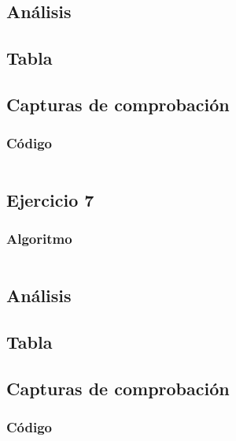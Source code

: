 \documentclass[12pt, letterpaper]{article}			%
\begin{document}
    		\subsection{Análisis}

    		\subsection{Tabla}
	        
	        \subsection{Capturas de comprobación}

	        \subsubsection{Código}
	            \begin{lstlisting}[style=Java]
    		    \end{lstlisting}

	    \subsection{Ejercicio 7}

			\subsubsection{Algoritmo}	    
    			\begin{lstlisting}[style=Java]
    		    \end{lstlisting}

    		\subsection{Análisis}

    		\subsection{Tabla}
	        
	        \subsection{Capturas de comprobación}

	        \subsubsection{Código}
	            \begin{lstlisting}[style=Java]
    		    \end{lstlisting}
\end{document}

